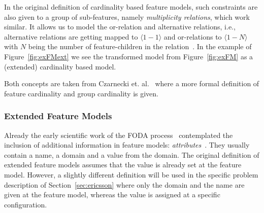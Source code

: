 In the original definition of cardinality based feature models, such constraints are also given to a group of sub-features, namely \emph{multiplicity relations}, which work similar. It allows us to model the or-relation and alternative relations, i.e., alternative relations are getting mapped to $\langle 1 - 1 \rangle$ and or-relations to $\langle 1 - N \rangle$ with $N$ being the number of feature-children in the relation~\cite{feature-model-survey, card-based-feature-models-formalization}. In the example of Figure~\ref{fig:exFMext} we see the transformed model from Figure~\ref{fig:exFM} as a (extended) cardinality based model.


Both concepts are taken from Czarnecki et. al.~\cite{card-based-feature-models-formalization} where a more formal definition of feature cardinality and group cardinality is given. 

\subsubsection*{Extended Feature Models} 

Already the early scientific work of the FODA process~\cite{feature-ori-pl-engineering} contemplated the inclusion of additional information in feature models: \emph{attributes}~\cite{feature-model-survey, auto-reason-fm}. They usually contain a name, a domain and a value from the domain. The original definition of extended feature models assumes that the value is already set at the feature model. However, a slightly different definition will be used in the specific problem description of Section~\ref{sec:ericsson} where only the domain and the name are given at the feature model, whereas the value is assigned at a specific configuration.


